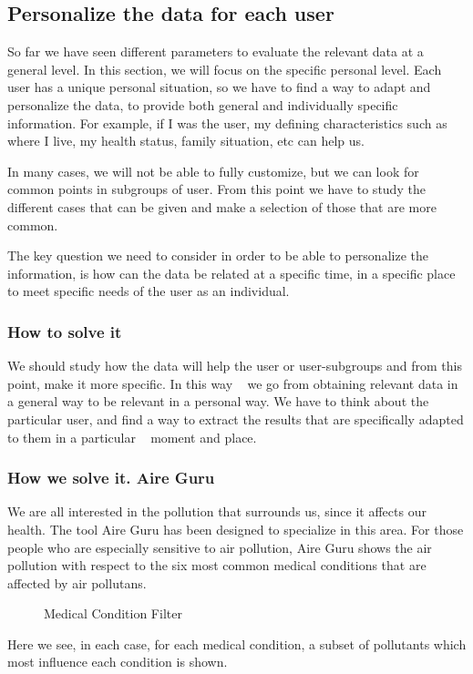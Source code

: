 \subsection{Personalize the data for each user}
So far we have seen different parameters to evaluate the relevant data at a general level. In this section, we will focus on the specific personal level.
Each user has a unique personal situation, so we have to find a way to adapt and personalize the data, to provide both general and individually specific information.
For example, if I was the user, my defining characteristics such as where I live,
my health status, family situation, etc can help us.

In many cases, we will not be able to fully customize, but we can look for common points in subgroups of
user. From this point we have to study the different cases that can be given and make a selection of those that are
more common.

The key question we need to consider in order to be able to personalize the information, is how can the data be related at a specific time, in a specific place to meet specific needs of the
user as an individual.

\subsubsection*{How to solve it} 

We should study how the data will help the user or user-subgroups and from this point, make it more specific. In this way
  we go from obtaining relevant data in a general way to be relevant in a personal way. We have to think about the
  particular user, and find a way to extract the results that are specifically adapted to them in a particular
  moment and place.

\subsubsection*{How we solve it. Aire Guru} 
 We are all interested in the pollution that surrounds us, since it affects our health. The tool
 Aire Guru has been designed to specialize in this area. For those people who are especially sensitive to air pollution, Aire Guru shows the air pollution with respect to the six most common medical conditions that
 are affected by air pollutans.
 

\begin{figure}[ht]
    \centering
    \hfill
    \hfill
  
  \caption{Medical Condition Filter}
    \end{figure}
  Here we see, in each case, for each medical condition, a subset of pollutants which most influence each condition is shown.
    
